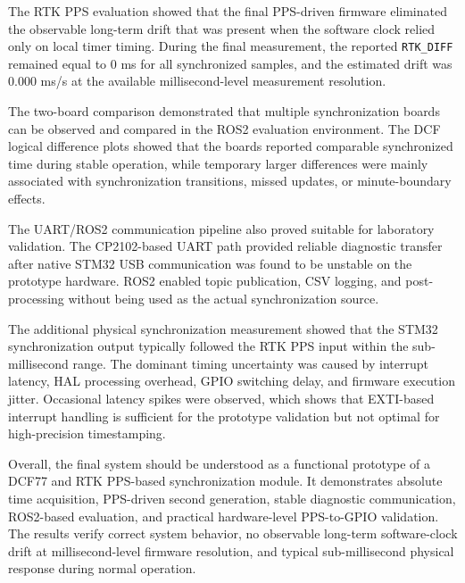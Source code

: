 The RTK PPS evaluation showed that the final PPS-driven firmware eliminated the observable long-term drift that was present when the software clock relied only on local timer timing. During the final measurement, the reported \texttt{RTK\_DIFF} remained equal to 0 ms for all synchronized samples, and the estimated drift was 0.000 ms/s at the available millisecond-level measurement resolution.

The two-board comparison demonstrated that multiple synchronization boards can be observed and compared in the ROS2 evaluation environment. The DCF logical difference plots showed that the boards reported comparable synchronized time during stable operation, while temporary larger differences were mainly associated with synchronization transitions, missed updates, or minute-boundary effects.

The UART/ROS2 communication pipeline also proved suitable for laboratory validation. The CP2102-based UART path provided reliable diagnostic transfer after native STM32 USB communication was found to be unstable on the prototype hardware. ROS2 enabled topic publication, CSV logging, and post-processing without being used as the actual synchronization source.

The additional physical synchronization measurement showed that the STM32 synchronization output typically followed the RTK PPS input within the sub-millisecond range. The dominant timing uncertainty was caused by interrupt latency, HAL processing overhead, GPIO switching delay, and firmware execution jitter. Occasional latency spikes were observed, which shows that EXTI-based interrupt handling is sufficient for the prototype validation but not optimal for high-precision timestamping.

Overall, the final system should be understood as a functional prototype of a DCF77 and RTK PPS-based synchronization module. It demonstrates absolute time acquisition, PPS-driven second generation, stable diagnostic communication, ROS2-based evaluation, and practical hardware-level PPS-to-GPIO validation. The results verify correct system behavior, no observable long-term software-clock drift at millisecond-level firmware resolution, and typical sub-millisecond physical response during normal operation.